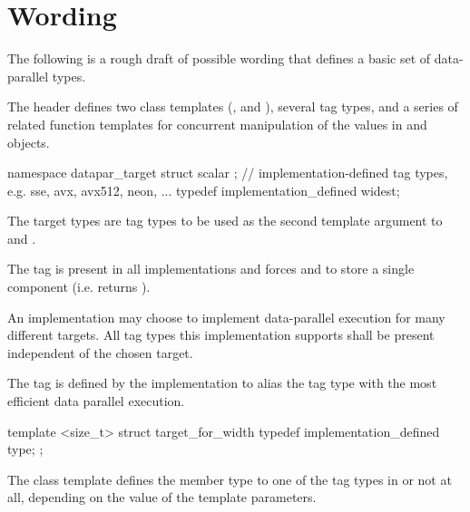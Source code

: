 \section{Wording}

The following is a rough draft of possible wording that defines a basic set of data-parallel types.

\begin{wgText}

  

  \pnum
  The header  defines two class templates (\datapar, and \mask), several tag types, and a series of related function templates for concurrent manipulation of the values in \datapar and \mask objects.

  \begin{itemdecl}
namespace datapar_target {
  struct scalar {};
  // implementation-defined tag types, e.g. sse, avx, avx512, neon, ...
  typedef implementation_defined widest;
}
  \end{itemdecl}
  \begin{itemdescr}
    \pnum
    The target types are tag types to be used as the second template argument to \datapar and \mask.

    \pnum
    The  tag is present in all implementations and forces \datapar and \mask to store a single component (i.e. \datapar{} returns ).

    \pnum
    An implementation may choose to implement data-parallel execution for many different targets.
    All tag types this implementation supports shall be present independent of the chosen target.

    \pnum
    The  tag is defined by the implementation to alias the tag type with the most efficient data parallel execution.
  \end{itemdescr}

  \begin{itemdecl}
template <size_t> struct target_for_width {
  typedef implementation_defined type;
};
  \end{itemdecl}
  \begin{itemdescr}
    \pnum
    The  class template defines the member type  to one of the tag types in  or not at all, depending on the value of the template parameters.


\end{itemdescr}
\end{wgText}
